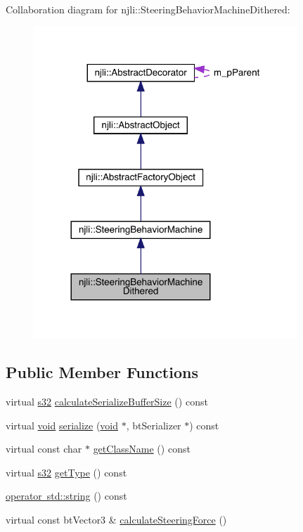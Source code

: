 Collaboration diagram for njli\+:\+:Steering\+Behavior\+Machine\+Dithered\+:\nopagebreak
\begin{figure}[H]
\begin{center}
\leavevmode
\includegraphics[width=281pt]{classnjli_1_1_steering_behavior_machine_dithered__coll__graph}
\end{center}
\end{figure}
\subsection*{Public Member Functions}
\begin{DoxyCompactItemize}
\item 
virtual \mbox{\hyperlink{_util_8h_aa62c75d314a0d1f37f79c4b73b2292e2}{s32}} \mbox{\hyperlink{classnjli_1_1_steering_behavior_machine_dithered_a72434033db333ed95de03c579eb96c15}{calculate\+Serialize\+Buffer\+Size}} () const
\item 
virtual \mbox{\hyperlink{_thread_8h_af1e856da2e658414cb2456cb6f7ebc66}{void}} \mbox{\hyperlink{classnjli_1_1_steering_behavior_machine_dithered_afabe12bcb2005f23bd4f7a79bd758cf2}{serialize}} (\mbox{\hyperlink{_thread_8h_af1e856da2e658414cb2456cb6f7ebc66}{void}} $\ast$, bt\+Serializer $\ast$) const
\item 
virtual const char $\ast$ \mbox{\hyperlink{classnjli_1_1_steering_behavior_machine_dithered_a3262e6d95dbb37c00fcc3436b1e48233}{get\+Class\+Name}} () const
\item 
virtual \mbox{\hyperlink{_util_8h_aa62c75d314a0d1f37f79c4b73b2292e2}{s32}} \mbox{\hyperlink{classnjli_1_1_steering_behavior_machine_dithered_a5c38478d79cba8bc3069eac4e24acc0a}{get\+Type}} () const
\item 
\mbox{\hyperlink{classnjli_1_1_steering_behavior_machine_dithered_aa23bb3e4de991237c1e5ad172d08ca21}{operator std\+::string}} () const
\item 
virtual const bt\+Vector3 \& \mbox{\hyperlink{classnjli_1_1_steering_behavior_machine_dithered_a9523006f50dc2ba0e2d6e3063c054ec4}{calculate\+Steering\+Force}} ()
\end{DoxyCompactItemize}
